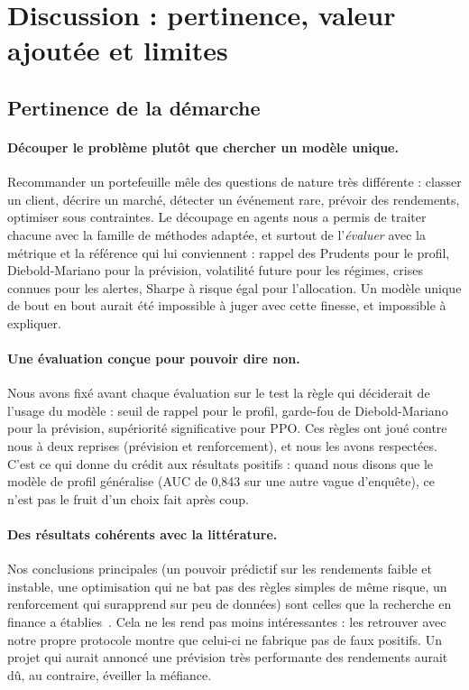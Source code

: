 \section{Discussion : pertinence, valeur ajoutée et limites}
\label{sec:discussion}

\subsection{Pertinence de la démarche}

\paragraph{Découper le problème plutôt que chercher un modèle unique.} Recommander un portefeuille mêle des questions de nature très différente : classer un client, décrire un marché, détecter un événement rare, prévoir des rendements, optimiser sous contraintes. Le découpage en agents nous a permis de traiter chacune avec la famille de méthodes adaptée, et surtout de l'\emph{évaluer} avec la métrique et la référence qui lui conviennent : rappel des Prudents pour le profil, Diebold-Mariano pour la prévision, volatilité future pour les régimes, crises connues pour les alertes, Sharpe à risque égal pour l'allocation. Un modèle unique de bout en bout aurait été impossible à juger avec cette finesse, et impossible à expliquer.

\paragraph{Une évaluation conçue pour pouvoir dire non.} Nous avons fixé avant chaque évaluation sur le test la règle qui déciderait de l'usage du modèle : seuil de rappel pour le profil, garde-fou de Diebold-Mariano pour la prévision, supériorité significative pour PPO. Ces règles ont joué contre nous à deux reprises (prévision et renforcement), et nous les avons respectées. C'est ce qui donne du crédit aux résultats positifs : quand nous disons que le modèle de profil généralise (AUC de 0,843 sur une autre vague d'enquête), ce n'est pas le fruit d'un choix fait après coup.

\paragraph{Des résultats cohérents avec la littérature.} Nos conclusions principales (un pouvoir prédictif sur les rendements faible et instable, une optimisation qui ne bat pas des règles simples de même risque, un renforcement qui surapprend sur peu de données) sont celles que la recherche en finance a établies~\cite{welch2008,demiguel2009,gu2020}. Cela ne les rend pas moins intéressantes : les retrouver avec notre propre protocole montre que celui-ci ne fabrique pas de faux positifs. Un projet qui aurait annoncé une prévision très performante des rendements aurait dû, au contraire, éveiller la méfiance.

